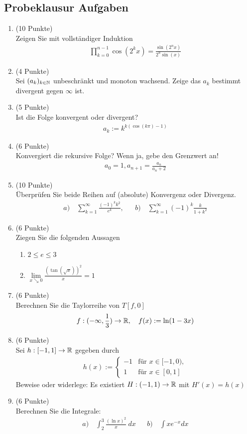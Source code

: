 \newcommand{\aufgabe}[1]{\item \hfill (#1 Punkte)\\}
\subsection{Probeklausur Aufgaben}
\begin{enumerate}[label=Aufgabe \arabic*:, , leftmargin=*, itemsep=-1ex]
    \aufgabe{10}
    Zeigen Sie mit vollständiger Induktion
    \begin{align*}
        \prod_{k = 0}^{n-1} \cos(2^k x) = \frac{\sin(2^nx)}{2^n \sin(x)}
    \end{align*}
    \aufgabe{4}
    Sei $(a_k)_{k \in \mathbb N}$ unbeschränkt und monoton wachsend. Zeige das $a_k$ bestimmt divergent gegen $\infty$ ist.
    \aufgabe{5}
    Ist die Folge konvergent oder divergent?
    \begin{align*}
        a_k := k^{k(\cos(k\pi)-1)}
    \end{align*}
    \aufgabe{6}
    Konvergiert die rekursive Folge? Wenn ja, gebe den Grenzwert an!
    \begin{align*}
        a_0 = 1, a_{n+1} = \frac{a_n}{a_n + 2}
    \end{align*}
    \aufgabe{10}
    Überprüfen Sie beide Reihen auf (absolute) Konvergenz oder Divergenz.
    \begin{align*}
        a) \quad \sum_{k = 1}^\infty \frac{(-1)^k k^2}{e^k}, && b) \quad \sum_{k=1}^\infty (-1)^k \frac{k}{1 + k^2}
    \end{align*}
    \aufgabe{6}
    Ziegen Sie die folgenden Aussagen
    \begin{enumerate}[label=\alph*)]
        \item $2 \leq e \leq 3$
        \item $\underset{x \searrow 0}{\lim} \frac{(\tan(\sqrt{x}))^2}{x} = 1$
    \end{enumerate}
    \aufgabe{6}
    Berechnen Sie die Taylorreihe von $T[f, 0]$
    \begin{align*}
        f: (-\infty, \frac{1}{3}) \rightarrow \mathbb R, \quad f(x) := \ln(1 - 3x)
    \end{align*}
    \aufgabe{6}
    Sei $h: [-1, 1] \rightarrow \mathbb R$ gegeben durch
    \begin{align*}
        h(x) := \begin{cases}
        -1 & \text{für } x \in [-1, 0),\\
        1 & \text{für } x \in [0,1]
        \end{cases}
    \end{align*}
    Beweise oder widerlege: Es existiert $H:(-1, 1) \rightarrow \mathbb R$ mit $H'(x) = h(x)$
    \aufgabe{6}
    Berechnen Sie die Integrale:
    \begin{align*}
        a) \quad \int_2^3 \frac{(\ln x)^2}{x} \ dx && b) \quad \int xe^{-x} dx
    \end{align*}
\end{enumerate}

